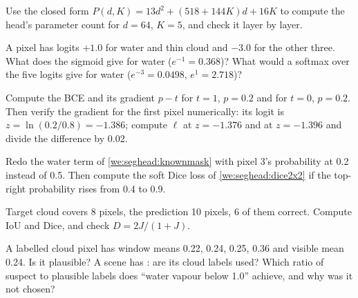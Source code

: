 \begin{checkyourself}
\item\label{ex:seghead:1} Use the closed form $P(d, K) = 13d^2 + (518 + 144K)d + 16K$ to compute the head's parameter count for $d = 64$, $K = 5$, and
  check it layer by layer.
\item\label{ex:seghead:2} A pixel has logits $+1.0$ for water and thin cloud and $-3.0$ for the other three. What does the sigmoid give for water
  ($e^{-1} = 0.368$)? What would a softmax over the five logits give for water ($e^{-3} = 0.0498$, $e^{1} = 2.718$)?
\item\label{ex:seghead:3} Compute the BCE and its gradient $p - t$ for $t = 1$, $p = 0.2$ and for $t = 0$, $p = 0.2$. Then verify the gradient for the
  first pixel numerically: its logit is $z = \ln(0.2/0.8) = -1.386$; compute $\ell$ at $z = -1.376$ and at $z = -1.396$ and divide the difference by 0.02.
\item\label{ex:seghead:4} Redo the water term of \cref{we:seghead:knownmask} with pixel 3's probability at 0.2 instead of 0.5. Then compute the soft
  Dice loss of \cref{we:seghead:dice2x2} if the top-right probability rises from 0.4 to 0.9.
\item\label{ex:seghead:5} Target cloud covers 8 pixels, the prediction 10 pixels, 6 of them correct. Compute IoU and Dice, and check $D = 2J/(1+J)$.
\item\label{ex:seghead:6} A labelled cloud pixel has window means 0.22, 0.24, 0.25, 0.36 and visible mean 0.24. Is it plausible? A scene has
  : are its cloud labels used? Which ratio of suspect to plausible labels does ``water vapour below 1.0'' achieve, and why was it
  not chosen?
\end{checkyourself}

\endgroup
